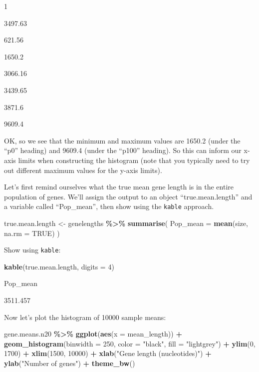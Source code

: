 \documentclass[
]{book}
\newenvironment{Shaded}{\begin{snugshade}}{\end{snugshade}}
\newcommand{\AttributeTok}[1]{\textcolor[rgb]{0.13,0.29,0.53}{#1}}
\newcommand{\ConstantTok}[1]{\textcolor[rgb]{0.56,0.35,0.01}{#1}}
\newcommand{\DecValTok}[1]{\textcolor[rgb]{0.00,0.00,0.81}{#1}}
\newcommand{\FunctionTok}[1]{\textcolor[rgb]{0.13,0.29,0.53}{\textbf{#1}}}
\newcommand{\NormalTok}[1]{#1}
\newcommand{\OtherTok}[1]{\textcolor[rgb]{0.56,0.35,0.01}{#1}}
\newcommand{\SpecialCharTok}[1]{\textcolor[rgb]{0.81,0.36,0.00}{\textbf{#1}}}
\newcommand{\StringTok}[1]{\textcolor[rgb]{0.31,0.60,0.02}{#1}}
\begin{document}
1

3497.63

621.56

1650.2

3066.16

3439.65

3871.6

9609.4

OK, so we see that the minimum and maximum values are 1650.2 (under the ``p0'' heading) and 9609.4 (under the ``p100'' heading). So this can inform our x-axis limits when constructing the histogram (note that you typically need to try out different maximum values for the y-axis limits).

Let's first remind ourselves what the true mean gene length is in the entire population of genes. We'll assign the output to an object ``true.mean.length'' and a variable called ``Pop\_mean'', then show using the \texttt{kable} approach.

\begin{Shaded}
\begin{Highlighting}[]
\NormalTok{true.mean.length }\OtherTok{\textless{}{-}}\NormalTok{ genelengths }\SpecialCharTok{\%\textgreater{}\%}
  \FunctionTok{summarise}\NormalTok{(}
    \AttributeTok{Pop\_mean =} \FunctionTok{mean}\NormalTok{(size, }\AttributeTok{na.rm =} \ConstantTok{TRUE}\NormalTok{)}
\NormalTok{  )}
\end{Highlighting}
\end{Shaded}

Show using \texttt{kable}:

\begin{Shaded}
\begin{Highlighting}[]
\FunctionTok{kable}\NormalTok{(true.mean.length, }\AttributeTok{digits =} \DecValTok{4}\NormalTok{)}
\end{Highlighting}
\end{Shaded}

Pop\_mean

3511.457

Now let's plot the histogram of 10000 sample means:

\begin{Shaded}
\begin{Highlighting}[]
\NormalTok{gene.means.n20 }\SpecialCharTok{\%\textgreater{}\%}
\FunctionTok{ggplot}\NormalTok{(}\FunctionTok{aes}\NormalTok{(}\AttributeTok{x =}\NormalTok{ mean\_length)) }\SpecialCharTok{+}
  \FunctionTok{geom\_histogram}\NormalTok{(}\AttributeTok{binwidth =} \DecValTok{250}\NormalTok{, }\AttributeTok{color =} \StringTok{"black"}\NormalTok{, }\AttributeTok{fill =} \StringTok{"lightgrey"}\NormalTok{) }\SpecialCharTok{+}
  \FunctionTok{ylim}\NormalTok{(}\DecValTok{0}\NormalTok{, }\DecValTok{1700}\NormalTok{) }\SpecialCharTok{+}
  \FunctionTok{xlim}\NormalTok{(}\DecValTok{1500}\NormalTok{, }\DecValTok{10000}\NormalTok{) }\SpecialCharTok{+}
  \FunctionTok{xlab}\NormalTok{(}\StringTok{"Gene length (nucleotides)"}\NormalTok{) }\SpecialCharTok{+}
  \FunctionTok{ylab}\NormalTok{(}\StringTok{"Number of genes"}\NormalTok{) }\SpecialCharTok{+}
  \FunctionTok{theme\_bw}\NormalTok{()}
\end{Highlighting}
\end{Shaded}
\end{document}
